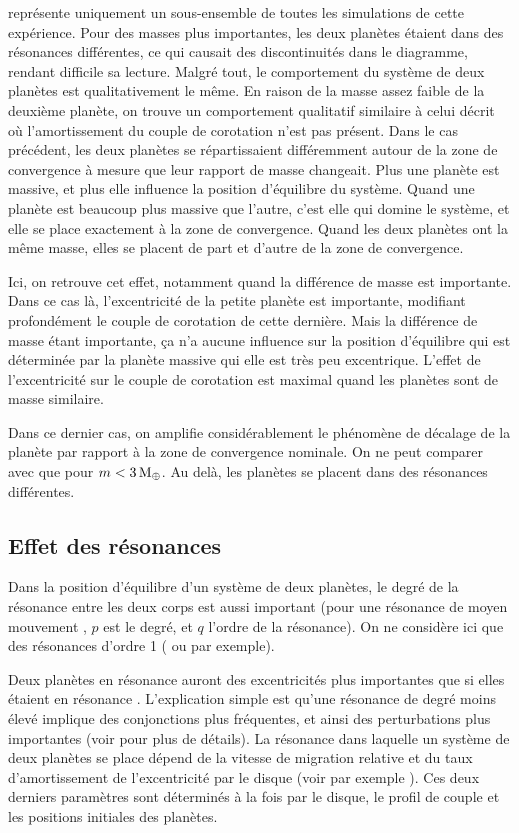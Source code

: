 \bigskip

 représente uniquement un sous-ensemble de toutes les simulations de cette expérience. Pour des
masses plus importantes, les deux planètes étaient dans des résonances différentes, ce qui causait des discontinuités dans le
diagramme, rendant difficile sa lecture. Malgré tout, le comportement du système de deux planètes est qualitativement le même. En raison de la masse assez faible de la deuxième planète, on trouve un comportement qualitatif similaire à celui décrit  où l'amortissement du couple de corotation n'est pas présent. Dans le cas précédent, les deux planètes se répartissaient différemment autour de la zone de convergence à mesure que leur rapport de masse changeait. Plus une planète est massive, et plus elle influence la position d'équilibre du système. Quand une planète est beaucoup plus massive que l'autre, c'est elle qui domine le système, et elle se place exactement à la zone de convergence. Quand les deux planètes ont la même masse, elles se placent de part et d'autre de la zone de convergence. 

Ici, on retrouve cet effet, notamment quand la différence de masse est importante. Dans ce cas là, l'excentricité de la petite planète est importante, modifiant profondément le couple de corotation de cette dernière. Mais la différence de masse étant importante, ça n'a aucune influence sur la position d'équilibre qui est déterminée par la planète massive qui elle est très peu excentrique. L'effet de l'excentricité sur le couple de corotation est maximal quand les planètes sont de masse similaire. 

Dans ce dernier cas, on amplifie considérablement le phénomène de décalage de la planète par rapport à la zone de convergence nominale. On ne peut comparer avec  que pour $m<3\mathrm{\thinspace M_\oplus}$. Au delà, les planètes se placent dans des résonances différentes.


\subsection{Effet des résonances}
Dans la position d'équilibre d'un système de deux planètes, le degré de la résonance entre les deux corps est aussi important (pour une résonance de moyen mouvement , $p$ est le degré, et $q$ l'ordre de la résonance). On ne considère ici que des résonances d'ordre 1 ( ou  par exemple).

Deux planètes en résonance  auront des excentricités plus importantes que si elles étaient en résonance . L'explication simple est qu'une résonance de degré moins élevé implique des conjonctions plus fréquentes, et ainsi des perturbations plus importantes (voir \cite{murray2000solar} pour plus de détails). La résonance dans laquelle un système de deux planètes se place dépend de la vitesse de migration relative et du taux d'amortissement de l'excentricité par le disque (voir par exemple \cite{mustill2011general}). Ces deux derniers paramètres sont déterminés à la fois par le disque, le profil de couple et les positions initiales des planètes. 

